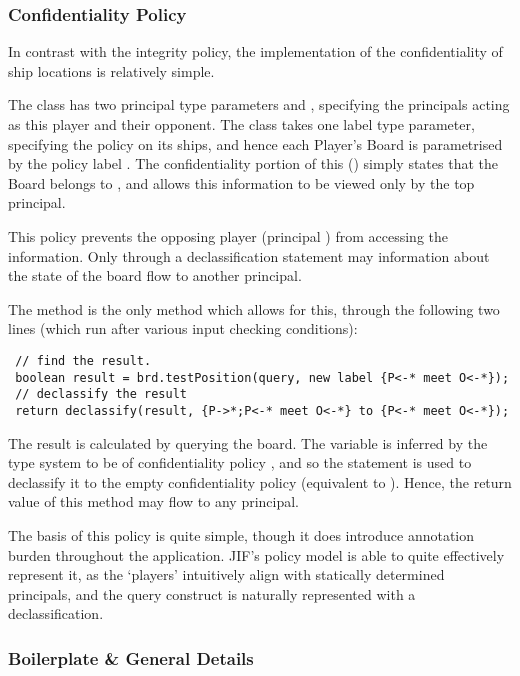 \subsubsection{Confidentiality Policy}

In contrast with the integrity policy, the implementation of the confidentiality of ship locations is relatively simple.

 The  class has two principal type parameters  and , specifying the principals acting as this player and their opponent. The  class takes one label type parameter, specifying the policy on its ships, and hence each Player's Board is parametrised by the policy label . The confidentiality portion of this () simply states that the Board belongs to , and  allows this information to be viewed only by the top principal.
 
 This policy prevents the opposing player (principal ) from accessing the information. Only through a declassification statement may information about the state of the board flow to another principal.
 
 The  method is the only method which allows for this, through the following two lines (which run after various input checking conditions):
 
 \begin{verbatim}
 // find the result.
 boolean result = brd.testPosition(query, new label {P<-* meet O<-*});
 // declassify the result
 return declassify(result, {P->*;P<-* meet O<-*} to {P<-* meet O<-*});
 \end{verbatim}
 
 The result is calculated by querying the board. The  variable is inferred by the type system to be of confidentiality policy , and so the  statement is used to declassify it to the empty confidentiality policy \jiflabel{} (equivalent to \jiflabel{\_->\_}). Hence, the return value of this method may flow to any principal.
 
 The basis of this policy is quite simple, though it does introduce annotation burden throughout the application. JIF's policy model is able to quite effectively represent it, as the `players' intuitively align with statically determined principals, and the query construct is naturally represented with a declassification.

\subsubsection{Boilerplate \& General Details}

